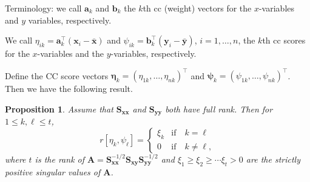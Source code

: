 \documentclass[]{book}
\newtheorem{proposition}{Proposition}[chapter]
\theoremstyle{definition}
\theoremstyle{definition}
\theoremstyle{definition}
\theoremstyle{remark}
\begin{document}
Terminology: we call \(\boldsymbol a_k\) and \(\boldsymbol b_k\) the \(k\)th cc (weight) vectors for the \(x\)-variables and \(y\) variables, respectively.

We call \(\eta_{ik}=\boldsymbol a_k^\top (\boldsymbol x_i - \bar{\boldsymbol x})\) and \(\psi_{ik}=\boldsymbol b_k^\top (\boldsymbol y_i -\bar{\boldsymbol y})\), \(i=1, \ldots , n\), the \(k\)th cc scores for the \(x\)-variables and the \(y\)-variables, respectively.

Define the CC score vectors \({\pmb \eta}_k=(\eta_{1k}, \ldots , \eta_{nk})^\top\) and \({\pmb \psi}_{k}=(\psi_{1k}, \ldots , \psi_{nk})^\top\). Then we have the following result.

\begin{proposition}
\protect\hypertarget{prp:unnamed-chunk-3}{}{\label{prp:unnamed-chunk-3} }Assume that \(\boldsymbol S_{\boldsymbol x\boldsymbol x}\) and \(\boldsymbol S_{\boldsymbol y\boldsymbol y}\) both have full rank. Then for \(1 \leq k,\ell \leq t\),
\[
r[\eta_k,  \psi_{\ell}]=\begin{cases} \xi_k &\text{if} \quad k=\ell\\
0 & \text{if} \quad k \neq \ell, \end{cases}
\]
where \(t\) is the rank of \(\boldsymbol A=\boldsymbol S_{\boldsymbol x\boldsymbol x}^{-1/2}\boldsymbol S_{\boldsymbol x\boldsymbol y} \boldsymbol S_{\boldsymbol y\boldsymbol y}^{-1/2}\) and \(\xi_1 \geq \xi_2 \geq \cdots \xi_t > 0\) are the strictly positive singular values of \(\boldsymbol A\).
\end{proposition}
\end{document}
